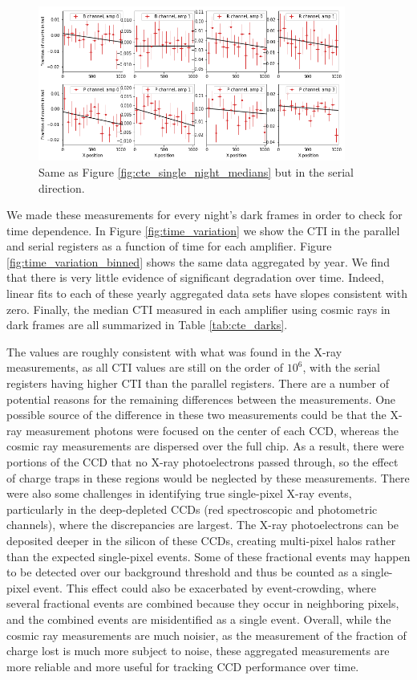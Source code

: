 \begin{figure}
    \centering
    \includegraphics[width=0.9\textwidth]{figures/cte/single_night_example_serial_medians.png}
    \caption{Same as Figure \ref{fig:cte_single_night_medians} but in the serial direction.}
    \label{fig:cte_single_night_serial_medians}
\end{figure}

We made these measurements for every night's dark frames in order to check for time dependence. In Figure \ref{fig:time_variation} we show the CTI in the parallel and serial registers as a function of time for each amplifier. Figure \ref{fig:time_variation_binned} shows the same data aggregated by year. We find that there is very little evidence of significant degradation over time. Indeed, linear fits to each of these yearly aggregated data sets have slopes consistent with zero. Finally, the median CTI measured in each amplifier using cosmic rays in dark frames are all summarized in Table \ref{tab:cte_darks}.

The values are roughly consistent with what was found in the X-ray measurements, as all CTI values are still on the order of $10^6$, with the serial registers having higher CTI than the parallel registers. There are a number of potential reasons for the remaining differences between the measurements. One possible source of the difference in these two measurements could be that the X-ray measurement photons were focused on the center of each CCD, whereas the cosmic ray measurements are dispersed over the full chip. As a result, there were portions of the CCD that no X-ray photoelectrons passed through, so the effect of charge traps in these regions would be neglected by these measurements. There were also some challenges in identifying true single-pixel X-ray events, particularly in the deep-depleted CCDs (red spectroscopic and photometric channels), where the discrepancies are largest. The X-ray photoelectrons can be deposited deeper in the silicon of these CCDs, creating multi-pixel halos rather than the expected single-pixel events. Some of these fractional events may happen to be detected over our background threshold and thus be counted as a single-pixel event. This effect could also be exacerbated by event-crowding, where several fractional events are combined because they occur in neighboring pixels, and the combined events are misidentified as a single event. Overall, while the cosmic ray measurements are much noisier, as the measurement of the fraction of charge lost is much more subject to noise, these aggregated measurements are more reliable and more useful for tracking CCD performance over time. 

